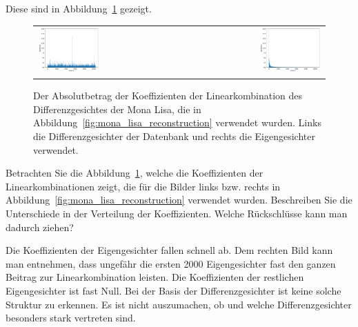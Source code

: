 Diese sind in Abbildung~\ref{fig:coef} gezeigt.
\begin{figure}[ht]
	\centering
	\begin{tabular}{lr}
		\includegraphics[width=0.45\textwidth]{images/eigenfaces/naive_coef} & \includegraphics[width=0.45\textwidth]{images/eigenfaces/eigen_coef} \\
	\end{tabular}
	\caption{Der Absolutbetrag der Koeffizienten der Linearkombination des Differenzgesichtes der Mona Lisa, die in Abbildung~\ref{fig:mona_lisa_reconstruction} verwendet wurden. Links die Differenzgesichter der Datenbank und rechts die Eigengesichter verwendet.}
	\label{fig:coef}
\end{figure}
\begin{aufgabe} \label{aufg:coef}
	Betrachten Sie die Abbildung~\ref{fig:coef}, welche die Koeffizienten der Linearkombinationen zeigt, die für die Bilder links bzw. rechts in Abbildung~\ref{fig:mona_lisa_reconstruction} verwendet wurden.
	Beschreiben Sie die Unterschiede in der Verteilung der Koeffizienten.
	Welche Rückschlüsse kann man dadurch ziehen?
\end{aufgabe}
\begin{losung}
	Die Koeffizienten der Eigengesichter fallen schnell ab.
	Dem rechten Bild kann man entnehmen, dass ungefähr die ersten 2000 Eigengesichter fast den ganzen Beitrag zur Linearkombination leisten.
	Die Koeffizienten der restlichen Eigengesichter ist fast Null.
	Bei der Basis der Differenzgesichter ist keine solche Struktur zu erkennen.
	Es ist nicht auszumachen, ob und welche Differenzgesichter besonders stark vertreten sind.
\end{losung}
